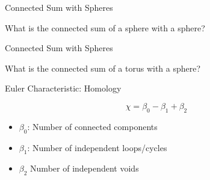 \documentclass{beamer}
\begin{document}
\begin{frame}{Connected Sum with Spheres}

What is the connected sum of a sphere with a sphere?

\end{frame}

\begin{frame}{Connected Sum with Spheres}

What is the connected sum of a torus with a sphere?

\end{frame}


\begin{frame}{Euler Characteristic: Homology}

\[ \chi = \beta_0 - \beta_1 + \beta_2 \]

\begin{itemize}[label=$\blacktriangleright$]

\item $\beta_0$: Number of connected components

\item $\beta_1$: Number of independent loops/cycles

\item $\beta_2$ Number of independent voids

\end{itemize}

\end{frame}
\end{document}
